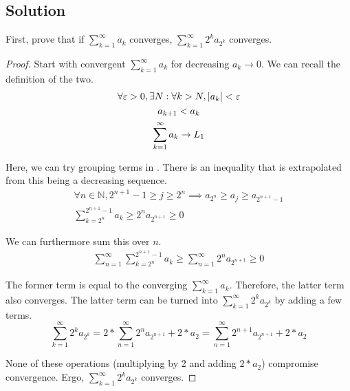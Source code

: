 \documentclass[12pt]{report}
\begin{document}
    \subsection{Solution}
        First, prove that if $\sum_{k=1}^{\infty} a_k$ converges, $\sum_{k=1}^{\infty} 2^k a_{2^k}$ converges.
        \begin{proof}
            Start with convergent $\sum_{k=1}^{\infty} a_k$ for decreasing $a_k \to 0$.
            We can recall the definition of the two.
            \begin{gather}
                \forall \varepsilon > 0, \exists N : \forall k > N, \left| a_k \right| < \varepsilon\\
                a_{k + 1} < a_{k}\\
                \sum_{k=1}^{\infty} a_k \to L_1
            \end{gather}

            Here, we can try grouping terms in .
            There is an inequality that is extrapolated from this being a decreasing sequence.
            \begin{gather}
                \forall n \in \mathbb{N}, 2^{n+1} - 1 \geq j \geq 2^n \implies a_{2^n} \geq a_j \geq a_{2^{n+1} - 1}\\
                \sum_{k=2^n}^{2^{n+1} - 1} a_k \geq 2^{n} a_{2^{n + 1}} \geq 0
            \end{gather}

            We can furthermore sum this over $n$.
            \begin{gather}
                \sum_{n = 1}^{\infty} \sum_{k=2^n}^{2^{n+1} - 1} a_k \geq \sum_{n = 1}^{\infty} 2^{n} a_{2^{n + 1}} \geq 0
            \end{gather}

            The former term is equal to the converging $\sum_{k=1}^{\infty} a_k$.
            Therefore, the latter term also converges.
            The latter term can be turned into $\sum_{k=1}^{\infty} 2^k a_{2^k}$ by adding a few terms.
            \begin{equation}
                \sum_{k=1}^{\infty} 2^k a_{2^k} = 2*\sum_{n = 1}^{\infty} 2^{n} a_{2^{n + 1}} + 2 * a_2
                    =   \sum_{n = 1}^{\infty} 2^{n + 1} a_{2^{n + 1}} + 2 * a_2
            \end{equation}

            None of these operations (multiplying by 2 and adding $2 * a_2$) compromise convergence.
            Ergo, $\sum_{k=1}^{\infty} 2^k a_{2^k}$ converges.
        \end{proof}
\end{document}
